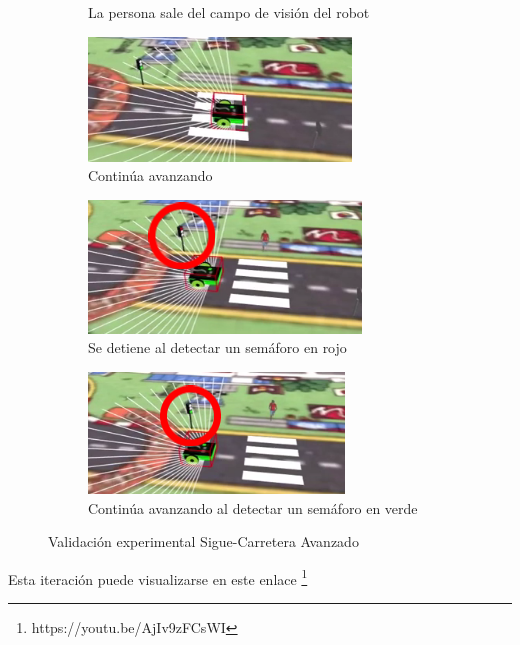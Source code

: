 \documentclass{report}
\begin{document}
\begin{figure}[h]
\begin{subfigure}{.5\textwidth}
  \caption{La persona sale del campo de visión del robot}
  \label{fig:sub-fourth}
\end{subfigure}
\begin{subfigure}{.5\textwidth}
  \centering
  \includegraphics[width=.7\linewidth]{images/cap4/5-1.png}  
  \caption{Continúa avanzando}
  \label{fig:sub-first}
\end{subfigure}
\begin{subfigure}{.5\textwidth}
  \centering
  \includegraphics[width=.7\linewidth]{images/cap4/6-1.png}  
  \caption{Se detiene al detectar un semáforo en rojo}
  \label{fig:sub-second}
\end{subfigure}
\begin{subfigure}{.5\textwidth}
  \centering
  \includegraphics[width=.7\linewidth]{images/cap4/7-1.png}  
  \caption{Continúa avanzando al detectar un semáforo en verde}
  \label{fig:sub-third}
\end{subfigure}
\caption{Validación experimental Sigue-Carretera Avanzado}
\label{fig:fig}
\end{figure}

Esta iteración puede visualizarse en este enlace \footnote{https://youtu.be/AjIv9zFCsWI}
\end{document}

